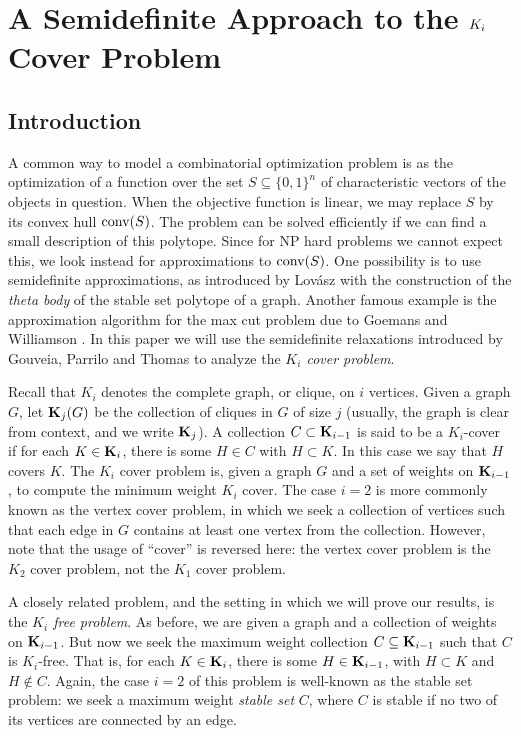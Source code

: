 \chapter{A Semidefinite Approach to the $K_\MakeLowercase{i}$ Cover Problem}
\label{chap:kicover}


\section{Introduction}
A common way to model a combinatorial optimization problem is as the optimization of a function over the set $S \subseteq \{0,1\}^n$ of  characteristic vectors of the objects in question. When the objective function is linear, 
we may replace $S$ by its convex hull $\hbox{conv}(S)$. The problem can be solved efficiently if we can find a small description of this polytope. Since for NP hard problems we cannot expect this, we look instead for  approximations to $\hbox{conv}(S)$. One possibility is to use semidefinite approximations, as introduced by Lov\'{a}sz \cite{lovasz} with the construction of the {\em theta body} of the stable set polytope of a graph. Another famous example is the approximation algorithm for the max cut problem due to Goemans and Williamson \cite{goemans_williamson}. In this paper we will use the semidefinite relaxations introduced by Gouveia, Parrilo and Thomas \cite{gpt} to analyze the {\em $K_i$ cover problem}.

Recall that $K_i$ denotes the complete graph, or clique, on $i$ vertices. Given a graph $G$, let $\mathbf{K}_j(G)$ be the collection of cliques in $G$ of size $j$ (usually, the graph is clear from context, and we write $\mathbf{K}_j$). A collection $C \subset \mathbf{K}_{i-1}$ is said to be a $K_i$-cover if for each $K \in \mathbf{K}_i$, there is some $H \in C$ with $H \subset K$. In this case we say that $H$ covers $K$. The $K_i$ cover problem is, given a graph $G$ and a set of weights on $\mathbf{K}_{i-1}$, to compute the minimum weight $K_i$ cover. The case $i=2$ is more commonly known as the vertex cover problem, in which we seek a collection of vertices such that each edge in $G$ contains at least one vertex from the collection. However, note that the usage of ``cover'' is reversed here: the vertex cover problem is the $K_2$ cover problem, not the $K_1$ cover problem.

A closely related problem, and the setting in which we will prove our results, is the {\em $K_i$ free problem}. As before, we are given a graph and a collection of weights on $\mathbf{K}_{i-1}$. But now we seek the maximum weight collection $C \subseteq \mathbf{K}_{i-1}$ such that $C$ is $K_i$-free. That is, for each $K \in \mathbf{K}_i$, there is some $H \in \mathbf{K}_{i-1}$, with $H \subset K$ and $H \notin C$. Again, the case $i=2$ of this problem is well-known as the stable set problem: we seek a maximum weight {\em stable set} $C$, where $C$ is stable if no two of its vertices are connected by an edge.

